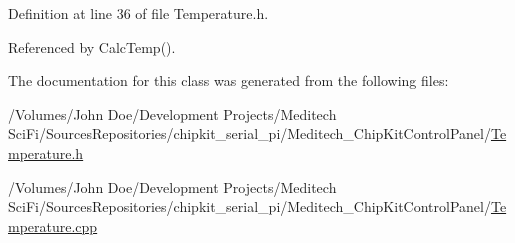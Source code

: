 Definition at line 36 of file Temperature.\-h.



Referenced by Calc\-Temp().



The documentation for this class was generated from the following files\-:\begin{DoxyCompactItemize}
\item 
/\-Volumes/\-John Doe/\-Development Projects/\-Meditech Sci\-Fi/\-Sources\-Repositories/chipkit\-\_\-serial\-\_\-pi/\-Meditech\-\_\-\-Chip\-Kit\-Control\-Panel/\hyperlink{_temperature_8h}{Temperature.\-h}\item 
/\-Volumes/\-John Doe/\-Development Projects/\-Meditech Sci\-Fi/\-Sources\-Repositories/chipkit\-\_\-serial\-\_\-pi/\-Meditech\-\_\-\-Chip\-Kit\-Control\-Panel/\hyperlink{_temperature_8cpp}{Temperature.\-cpp}\end{DoxyCompactItemize}
